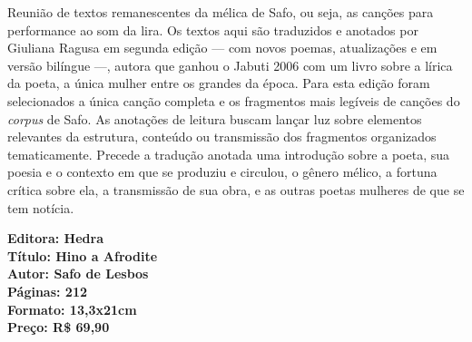 \hspace*{-7cm}\hrulefill\hspace*{-7cm}

\medskip

\noindent{}Reunião de textos remanescentes da mélica de Safo, ou seja, as canções para performance ao som da lira. Os textos aqui são traduzidos e anotados por Giuliana Ragusa em segunda edição --- com novos poemas, atualizações e em versão bilíngue ---, autora que ganhou o Jabuti 2006 com um livro sobre a lírica da poeta, a única mulher entre os grandes da época. Para esta edição foram selecionados a única canção completa e os fragmentos mais legíveis de canções do \textit{corpus} de Safo. As anotações de leitura buscam lançar luz sobre elementos relevantes da estrutura, conteúdo ou transmissão dos fragmentos organizados tematicamente. Precede a tradução anotada uma introdução sobre a poeta, sua poesia e o contexto em que se produziu e circulou, o gênero mélico, a fortuna crítica sobre ela, a transmissão de sua obra, e as outras poetas mulheres de que se tem notícia.

\vfill

\noindent\begin{minipage}[c]{1\linewidth}
{\small\textbf{
\hspace*{-.1cm}Editora: Hedra\\
Título: Hino a Afrodite\\
Autor: Safo de Lesbos\\ 
Páginas: 212\\
Formato: 13,3x21cm\\
Preço: R\$ 69,90\\
}}
\end{minipage}

\pagebreak







